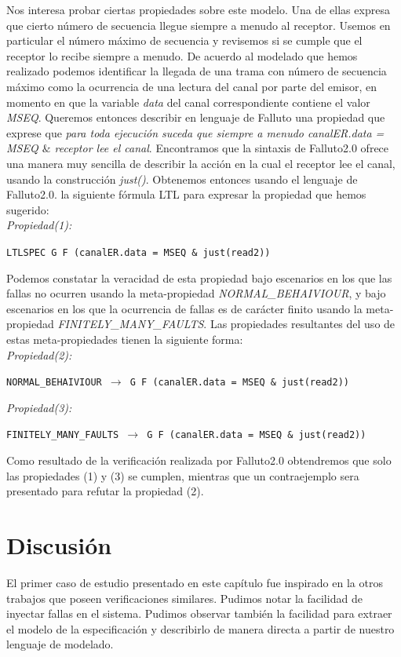 \documentclass[titlepage, 12pt]{book}
\newcommand{\textff}[1]{\begin{center}\texttt{#1}\end{center}}
\begin{document}
Nos interesa probar ciertas propiedades sobre este modelo. Una de ellas expresa que cierto n\'umero de secuencia llegue siempre a menudo al receptor. Usemos en particular el n\'umero m\'aximo de secuencia y revisemos si se cumple que el receptor lo recibe siempre a menudo. De acuerdo al modelado que hemos realizado podemos identificar la llegada de una trama con n\'umero de secuencia m\'aximo como la ocurrencia de una lectura del canal por parte del emisor, en momento en que la variable \textit{data} del canal correspondiente contiene el valor \textit{MSEQ}. Queremos entonces describir en lenguaje de Falluto una propiedad que exprese que \textit{para toda ejecuci\'on suceda que siempre a menudo canalER.data = MSEQ $\&$ receptor lee el canal}. Encontramos que la sintaxis de Falluto2.0 ofrece una manera muy sencilla de describir la acci\'on en la cual el receptor lee el canal, usando la construcci\'on \textit{just()}. Obtenemos entonces usando el lenguaje de Falluto2.0. la siguiente f\'ormula LTL para expresar la propiedad que hemos sugerido: \\

\textit{Propiedad(1):} \textff{LTLSPEC G F (canalER.data = MSEQ \& just(read2))}

Podemos constatar la veracidad de esta propiedad bajo escenarios en los que las fallas no ocurren usando la meta-propiedad \textit{NORMAL\_BEHAIVIOUR}, y bajo escenarios en los que la ocurrencia de fallas es de car\'acter finito usando la meta-propiedad \textit{FINITELY\_MANY\_FAULTS}. Las propiedades resultantes del uso de estas meta-propiedades tienen la siguiente forma:\\

\textit{Propiedad(2):} \textff{NORMAL\_BEHAIVIOUR $\rightarrow$ G~F~(canalER.data = MSEQ~\&~just(read2))}

\textit{Propiedad(3):} \textff{FINITELY\_MANY\_FAULTS $\rightarrow$ G~F~(canalER.data = MSEQ~\&~just(read2))}


Como resultado de la verificaci\'on realizada por Falluto2.0 obtendremos que solo las propiedades (1) y (3) se cumplen, mientras que un contraejemplo sera presentado para refutar la propiedad (2). 

\section{Discusi\'on}

El primer caso de estudio presentado en este cap\'itulo fue inspirado en la otros trabajos que poseen verificaciones similares. Pudimos notar la facilidad de inyectar fallas en el sistema. Pudimos observar tambi\'en la facilidad para extraer el modelo de la especificaci\'on y describirlo de manera directa a partir de nuestro lenguaje de modelado.
\end{document}
